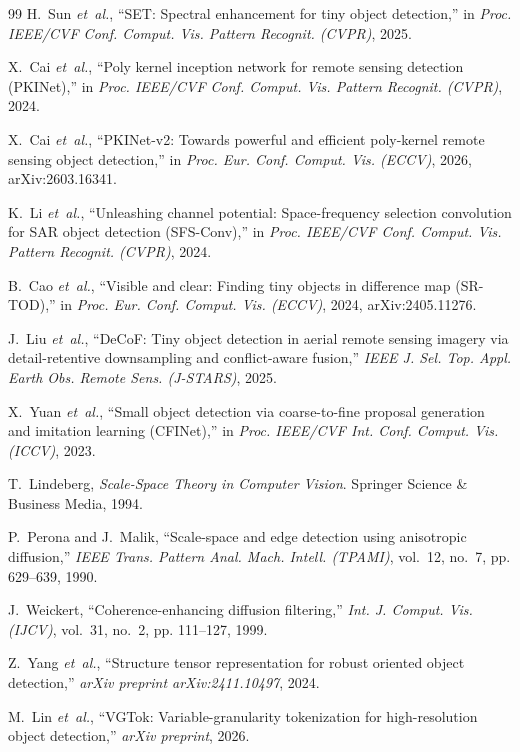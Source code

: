 \documentclass[11pt,a4paper]{article}
\begin{document}
\begin{thebibliography}{99}
H.~Sun \emph{et~al.}, ``SET: Spectral enhancement for tiny object detection,'' in \emph{Proc. IEEE/CVF Conf. Comput. Vis. Pattern Recognit. (CVPR)}, 2025.

X.~Cai \emph{et~al.}, ``Poly kernel inception network for remote sensing detection (PKINet),'' in \emph{Proc. IEEE/CVF Conf. Comput. Vis. Pattern Recognit. (CVPR)}, 2024.

X.~Cai \emph{et~al.}, ``PKINet-v2: Towards powerful and efficient poly-kernel remote sensing object detection,'' in \emph{Proc. Eur. Conf. Comput. Vis. (ECCV)}, 2026, arXiv:2603.16341.

K.~Li \emph{et~al.}, ``Unleashing channel potential: Space-frequency selection convolution for SAR object detection (SFS-Conv),'' in \emph{Proc. IEEE/CVF Conf. Comput. Vis. Pattern Recognit. (CVPR)}, 2024.

B.~Cao \emph{et~al.}, ``Visible and clear: Finding tiny objects in difference map (SR-TOD),'' in \emph{Proc. Eur. Conf. Comput. Vis. (ECCV)}, 2024, arXiv:2405.11276.

J.~Liu \emph{et~al.}, ``DeCoF: Tiny object detection in aerial remote sensing imagery via detail-retentive downsampling and conflict-aware fusion,'' \emph{IEEE J. Sel. Top. Appl. Earth Obs. Remote Sens. (J-STARS)}, 2025.

X.~Yuan \emph{et~al.}, ``Small object detection via coarse-to-fine proposal generation and imitation learning (CFINet),'' in \emph{Proc. IEEE/CVF Int. Conf. Comput. Vis. (ICCV)}, 2023.

T.~Lindeberg, \emph{Scale-Space Theory in Computer Vision}. Springer Science \& Business Media, 1994.

P.~Perona and J.~Malik, ``Scale-space and edge detection using anisotropic diffusion,'' \emph{IEEE Trans. Pattern Anal. Mach. Intell. (TPAMI)}, vol.~12, no.~7, pp. 629--639, 1990.

J.~Weickert, ``Coherence-enhancing diffusion filtering,'' \emph{Int. J. Comput. Vis. (IJCV)}, vol.~31, no.~2, pp. 111--127, 1999.

Z.~Yang \emph{et~al.}, ``Structure tensor representation for robust oriented object detection,'' \emph{arXiv preprint arXiv:2411.10497}, 2024.

M.~Lin \emph{et~al.}, ``VGTok: Variable-granularity tokenization for high-resolution object detection,'' \emph{arXiv preprint}, 2026.


\end{thebibliography}
\end{document}
